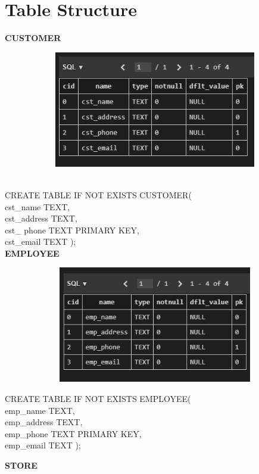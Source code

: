 \documentclass[12pt,a4paper]{report}
\begin{document}
\section{Table Structure}
\textbf{CUSTOMER}\\
\begin{figure}[hbtp]
\centering
\includegraphics[width=5in,height=2in]{../fig/customer}\\
\end{figure}\\
CREATE TABLE IF NOT EXISTS CUSTOMER(\\
cst\_name TEXT,\\
cst\_address TEXT,\\
cst\_ phone TEXT PRIMARY KEY,\\
cst\_email TEXT );    \\
\linebreak
\textbf{EMPLOYEE}\\
\begin{figure}[hbtp]
\centering
\includegraphics[width=5in,height=2in]{../fig/employee}\\
\end{figure}
\newpage
\noindent CREATE TABLE IF NOT EXISTS EMPLOYEE(\\
emp\_name TEXT,\\
emp\_address TEXT,\\
emp\_phone TEXT PRIMARY KEY,\\
emp\_email TEXT  );\\
\begin{flushleft}
\textbf{STORE}\\
\end{flushleft}
\end{document}
